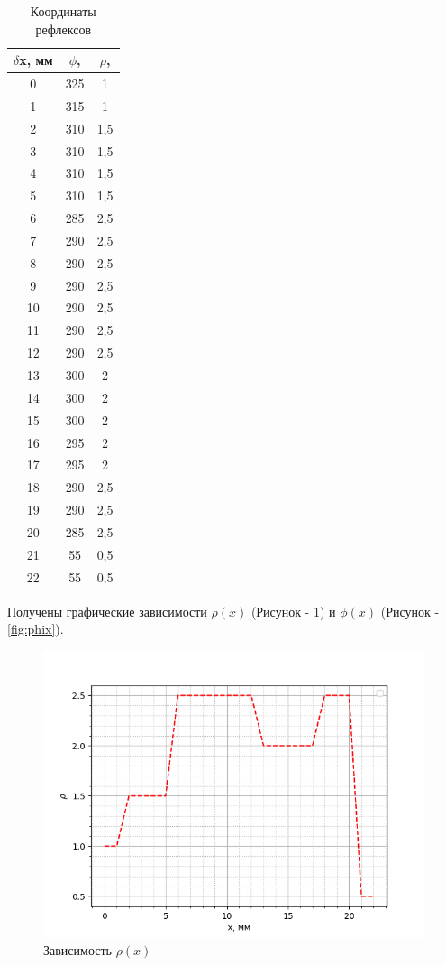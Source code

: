 \begin{table}[H]
    \centering
	\begin{threeparttable}%
    \caption{Координаты рефлексов}\label{tab:base}
    \begin{tabular}{|c|c|c|}
        \hline
		$\delta$x, мм   & $\phi$, \degree & $\rho$, \degree \\ \hline
		0  & 325 & 1   \\ \hline
		1  & 315 & 1   \\ \hline
		2  & 310 & 1,5 \\ \hline
		3  & 310 & 1,5 \\ \hline
		4  & 310 & 1,5 \\ \hline
		5  & 310 & 1,5 \\ \hline
		6  & 285 & 2,5 \\ \hline
		7  & 290 & 2,5 \\ \hline
		8  & 290 & 2,5 \\ \hline
		9  & 290 & 2,5 \\ \hline
		10 & 290 & 2,5 \\ \hline
		11 & 290 & 2,5 \\ \hline
		12 & 290 & 2,5 \\ \hline
		13 & 300 & 2   \\ \hline
		14 & 300 & 2   \\ \hline
		15 & 300 & 2   \\ \hline
		16 & 295 & 2   \\ \hline
		17 & 295 & 2   \\ \hline
		18 & 290 & 2,5 \\ \hline
		19 & 290 & 2,5 \\ \hline
		20 & 285 & 2,5 \\ \hline
		21 & 55  & 0,5 \\ \hline
		22 & 55  & 0,5 \\ \hline
    \end{tabular}
	\end{threeparttable}
\end{table}

Получены графические зависимости $\rho(x)$ (Рисунок - \ref{fig:rhox})  и $\phi(x)$ (Рисунок - \ref{fig:phix}).

\begin{figure}[H]
        \centering
        \includegraphics[width=0.7\columnwidth]{figures/rhox}%
        \caption{Зависимость $\rho(x)$}
		\label{fig:rhox}
\end{figure}

